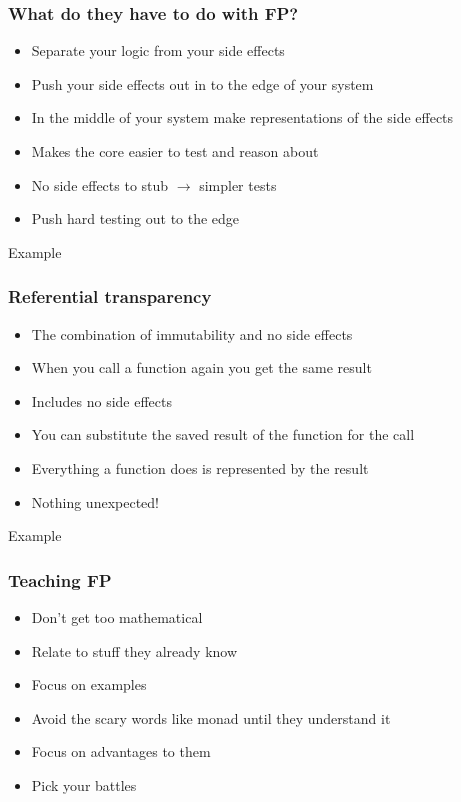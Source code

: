 \documentclass{beamer}
\begin{document}
\begin{frame}
  \frametitle{What do they have to do with FP?}
  \begin{itemize}
    \item Separate your logic from your side effects
    \item Push your side effects out in to the edge of your system
    \item In the middle of your system make representations of the side effects
    \item Makes the core easier to test and reason about
    \item No side effects to stub $\rightarrow$ simpler tests
    \item Push hard testing out to the edge
  \end{itemize}
\end{frame}

\begin{frame}
  \begin{center}
    \Huge Example
  \end{center}
\end{frame}

\begin{frame}
  \frametitle{Referential transparency}
  \begin{itemize}
    \item The combination of immutability and no side effects
    \item When you call a function again you get the same result
    \item Includes no side effects
    \item You can substitute the saved result of the function for the call
    \item Everything a function does is represented by the result
    \item Nothing unexpected!
  \end{itemize}
\end{frame}

\begin{frame}
  \begin{center}
    \Huge Example
  \end{center}
\end{frame}

\begin{frame}
  \frametitle{Teaching FP}
  \begin{itemize}
    \item Don't get too mathematical
    \item Relate to stuff they already know
    \item Focus on examples
    \item Avoid the scary words like monad until they understand it
    \item Focus on advantages to them
    \item Pick your battles
  \end{itemize}
\end{frame}
\end{document}
